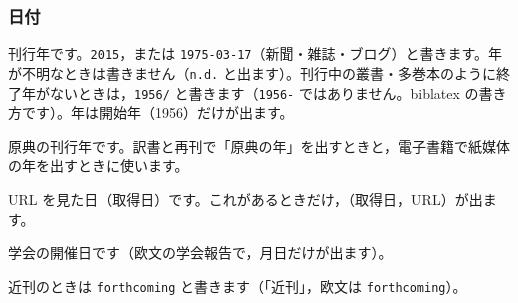 \subsubsection{日付}
\begin{fieldlist}

刊行年です。\texttt{2015}，または \texttt{1975-03-17}（新聞・雑誌・ブログ）と書きます。年が不明なときは書きません（\texttt{n.d.} と出ます）。刊行中の叢書・多巻本のように終了年がないときは，\texttt{1956/} と書きます（\texttt{1956-} ではありません。biblatex の書き方です）。年は開始年（1956）だけが出ます。


原典の刊行年です。訳書と再刊で「原典の年」を出すときと，電子書籍で紙媒体の年を出すときに使います。


URL を見た日（取得日）です。これがあるときだけ，（取得日，URL）が出ます。


学会の開催日です（欧文の学会報告で，月日だけが出ます）。


近刊のときは \texttt{forthcoming} と書きます（「近刊」，欧文は \texttt{forthcoming}）。
\end{fieldlist}

